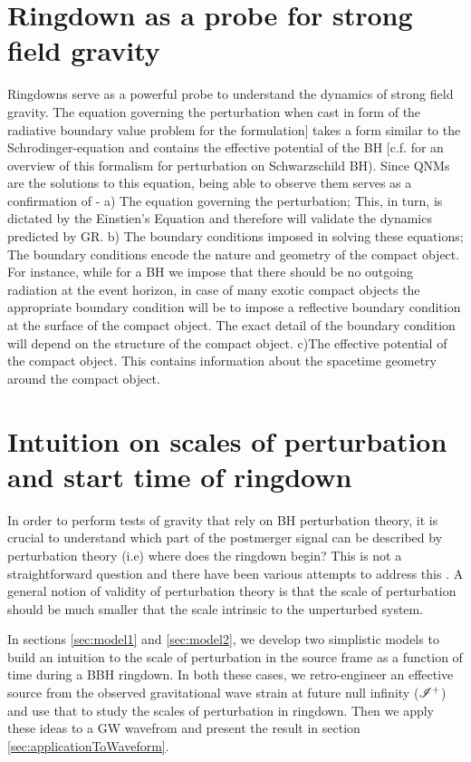 \section{Ringdown as a probe for strong field gravity}
Ringdowns serve as a powerful probe to understand the dynamics of strong field gravity. The equation governing the perturbation when cast in form of the radiative boundary value problem \cite{PhysRevD.2.2141,1985RSPSA.402..285L,Teukolsky:2014vca} for the formulation] takes a form similar to the Schrodinger-equation and contains the effective potential of the BH [c.f. \cite{ChandrasBookOnSchwarschildPert} for an overview of this formalism for perturbation on Schwarzschild BH). Since QNMs are the solutions to this equation, being able to observe them serves as a confirmation of - a) The equation governing the perturbation; This, in turn, is dictated by the Einstien's Equation and therefore will validate the dynamics predicted by GR.  b) The boundary conditions imposed in solving these equations; The boundary conditions encode the nature and geometry of the compact object. For instance, while for a BH we impose that there should be no outgoing radiation at the event horizon, in case of many exotic compact objects the appropriate boundary condition will be to impose a reflective boundary condition at the surface of the compact object. The exact detail of the boundary condition will depend on the structure of the compact object. c)The effective potential of the compact object. This contains information about the spacetime geometry around the compact object.   

\section{Intuition on scales of perturbation and start time of ringdown}
In order to perform tests of gravity that rely on BH perturbation theory, it is crucial to understand which part of the postmerger signal can be described by perturbation theory (i.e) where does the ringdown begin? This is not a straightforward question and there have been various attempts to address this \cite{EMOP,Baibhav:2017jhs,London,2012PhRvL.109n1102K}. A general notion of validity of perturbation theory is that the scale of perturbation should be much smaller that the scale intrinsic to the unperturbed system. 

In sections \ref{sec:model1} and \ref{sec:model2}, we develop two simplistic models to build an intuition to the scale of perturbation in the source frame as a function of time during a BBH ringdown. In both these cases, we retro-engineer an effective source from the observed gravitational wave strain at future null infinity ($\mathscr{I^+}$) and use that to study the scales of perturbation in ringdown. Then we apply these ideas to a GW wavefrom and present the result in section \ref{sec:applicationToWaveform}.
 
